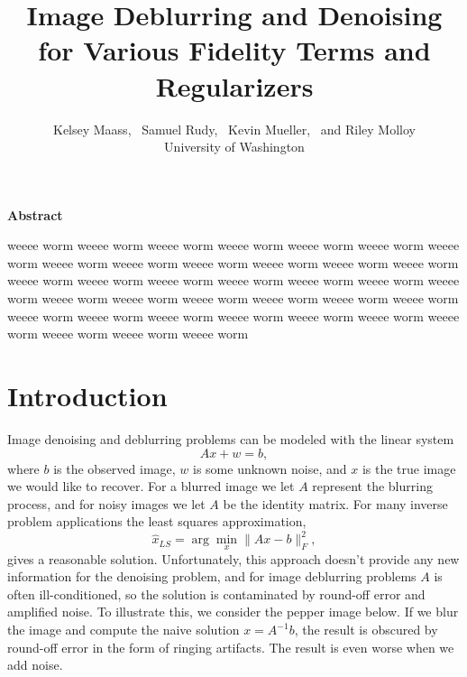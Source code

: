 \documentclass[10pt,a4paper]{article}
\begin{document}
\title{Image Deblurring and Denoising for Various Fidelity Terms and Regularizers}
\author{
Kelsey Maass, ~Samuel Rudy, ~Kevin Mueller, ~and Riley Molloy\\
University of Washington\\
}

\maketitle

\begin{center}
\begin{minipage}{0.8\textwidth}
\begin{center}
\textbf{Abstract}
\end{center}
weeee worm weeee worm weeee worm weeee worm weeee worm weeee worm weeee worm weeee worm weeee worm weeee worm weeee worm weeee worm weeee worm weeee worm weeee worm weeee worm weeee worm weeee worm weeee worm weeee worm weeee worm weeee worm weeee worm weeee worm weeee worm weeee worm weeee worm weeee worm weeee worm weeee worm weeee worm weeee worm weeee worm weeee worm weeee worm weeee worm 
\end{minipage}
\end{center}

\section{Introduction}

Image denoising and deblurring problems can be modeled with the linear system
\begin{equation}
Ax + w = b,
\end{equation}
where $b$ is the observed image, $w$ is some unknown noise, and $x$ is the true image we would like to recover. For a blurred image we let $A$ represent the blurring process, and for noisy images we let $A$ be the identity matrix. For many inverse problem applications the least squares approximation, 
\begin{equation}
\hat{x}_{LS} = \arg\min_x \| Ax - b \|_F^2 ,
\end{equation}
gives a reasonable solution. Unfortunately, this approach doesn't provide any new information for the denoising problem, and for image deblurring problems $A$ is often ill-conditioned, so the solution is contaminated by round-off error and amplified noise. To illustrate this, we consider the pepper image below. If we blur the image and compute the naive solution $x = A^{-1}b$, the result is obscured by round-off error in the form of ringing artifacts. The result is even worse when we add noise.
\end{document}
